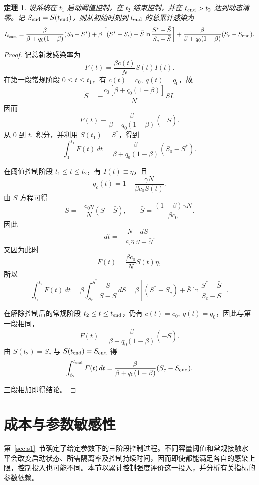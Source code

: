 \documentclass[UTF8,a4paper,10pt,fontset=fandol]{ctexart}
\theoremstyle{cnplain}
\newtheorem{theorem}{定理}[section]
\theoremstyle{remark}
\newcommand{\Itcum}{I_{t_{\mathrm{cum}}}}
\numberwithin{equation}{section}
\begin{document}
\begin{theorem}\label{thm:s1:Itcum}
    设系统在 $t_1$ 启动阈值控制，在 $t_2$ 结束控制，并在 $t_{\rm end}>t_2$ 达到动态清零。记 $S_{\rm end}=S(t_{\rm end})$，则从初始时刻到 $t_{\rm end}$ 的总累计感染为
    \[
    \Itcum
    =
    \frac{\beta}{\beta+q_0(1-\beta)}(S_0-S^*)
    +
    \beta\left[
    (S^*-S_c)+\bar S\ln\frac{S^*-\bar S}{S_c-\bar S}
    \right]
    +
    \frac{\beta}{\beta+q_0(1-\beta)}(S_c-S_{\rm end}).
    \]
\end{theorem}
\begin{proof}
    记总新发感染率为
    \[
    F(t)=\frac{\beta c(t)}{N}S(t)I(t).
    \]
    在第一段常规阶段 $0\le t\le t_1$，有 $c(t)=c_0,\ q(t)=q_0$，故
    \[
    \dot S
    =
    -\frac{c_0[\beta+q_0(1-\beta)]}{N}SI.
    \]
    因而
    \[
    F(t)
    =
    \frac{\beta}{\beta+q_0(1-\beta)}(-\dot S).
    \]
    从 $0$ 到 $t_1$ 积分，并利用 $S(t_1)=S^*$，得到
    \[
    \int_0^{t_1}F(t)\,dt
    =
    \frac{\beta}{\beta+q_0(1-\beta)}(S_0-S^*).
    \]

    在阈值控制阶段 $t_1\le t\le t_2$，有 $I(t)\equiv\eta$，且
    \[
    q_c(t)=1-\frac{\gamma N}{\beta c_0S(t)}.
    \]
    由 $S$ 方程可得
    \[
    \dot S
    =
    -\frac{c_0\eta}{N}(S-\bar S),
    \qquad
    \bar S=\frac{(1-\beta)\gamma N}{\beta c_0}.
    \]
    因此
    \[
    dt
    =
    -\frac{N}{c_0\eta}\frac{dS}{S-\bar S}.
    \]
    又因为此时
    \[
    F(t)=\frac{\beta c_0}{N}S(t)\eta,
    \]
    所以
    \[
    \int_{t_1}^{t_2}F(t)\,dt
    =
    \beta\int_{S_c}^{S^*}\frac{S}{S-\bar S}\,dS
    =
    \beta\left[
    (S^*-S_c)+\bar S\ln\frac{S^*-\bar S}{S_c-\bar S}
    \right].
    \]

    在解除控制后的常规阶段 $t_2\le t\le t_{\rm end}$，仍有
    $c(t)=c_0,\ q(t)=q_0$，因此与第一段相同，
    \[
    F(t)
    =
    \frac{\beta}{\beta+q_0(1-\beta)}(-\dot S).
    \]
    由 $S(t_2)=S_c$ 与 $S(t_{\rm end})=S_{\rm end}$ 得
    \[
    \int_{t_2}^{t_{\rm end}}F(t)\,dt
    =
    \frac{\beta}{\beta+q_0(1-\beta)}(S_c-S_{\rm end}).
    \]

    三段相加即得结论。
\end{proof}

\section{成本与参数敏感性}
\label{sec:cost}
第~\ref{sec:s1}~节确定了给定参数下的三阶段控制过程。不同容量阈值和常规接触水平会改变启动状态、所需隔离率及控制持续时间，因而即使都能满足各自的感染上限，控制投入也可能不同。本节以累计控制强度评价这一投入，并分析有关指标的参数依赖。
\end{document}
